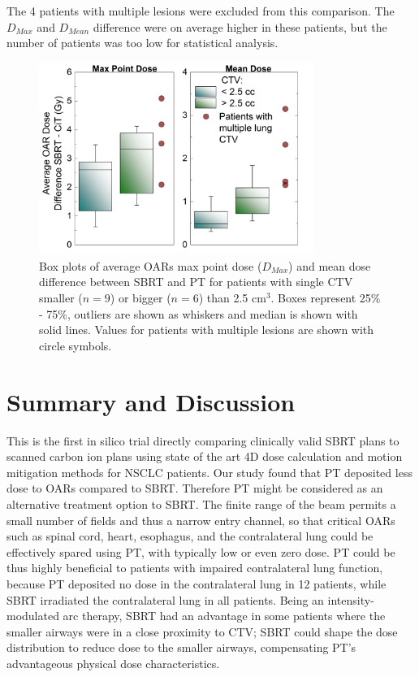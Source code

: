 The 4 patients with multiple lesions were excluded from this comparison. The $D_{Max}$ and $D_{Mean}$ difference were on average higher in these patients, but the number of patients was too low for statistical analysis. 

\newpage
\begin{figure}[H]
\begin{center}
\includegraphics[width=0.8\textwidth]{./PatientStudy/Images/Figure4.png}
\caption{Box plots of average OARs max point dose ($D_{Max}$) and mean dose difference between SBRT and PT for patients with single CTV smaller ($n = 9$) or bigger ($n = 6$) than 2.5 cm$^{3}$. Boxes represent 25\% - 75\%, outliers are shown as whiskers and median is shown with solid lines. Values for patients with multiple lesions are shown with circle symbols.}
\label{Fig:OAR_boxplots}
\end{center}
\end{figure}


\section{Summary and Discussion}

This is the first in silico trial directly comparing clinically valid SBRT plans to scanned carbon ion plans using state of the art 
4D dose calculation and motion mitigation methods for NSCLC patients. Our study found that PT deposited less dose to OARs compared 
to SBRT. Therefore PT might be considered as an alternative treatment option to SBRT. The finite range of the beam permits a small 
number of fields and thus a narrow entry channel, so that critical OARs such as spinal cord, heart, esophagus, and the contralateral 
lung could be effectively spared using PT, with typically low or even zero dose. PT could be thus highly beneficial to patients with 
impaired contralateral lung function, because PT deposited no dose in the contralateral lung in 12 patients, while SBRT irradiated 
the contralateral lung in all patients. Being an intensity-modulated arc therapy, SBRT had an advantage in some patients where the 
smaller airways were in a close proximity to CTV; SBRT could shape the dose distribution to reduce dose to the smaller airways, 
compensating PT's advantageous physical dose characteristics.

